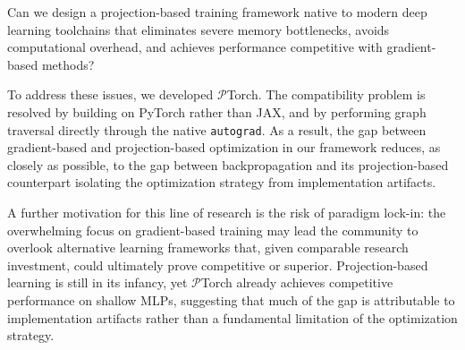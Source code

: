 \documentclass{article}
\theoremstyle{plain}
\theoremstyle{definition}
\theoremstyle{remark}
\begin{document}

\vspace{0.5em}
\begin{tcolorbox}[researchcard]
Can we design a projection-based training framework native to modern deep learning toolchains that eliminates severe memory bottlenecks, avoids computational overhead, and achieves performance competitive with gradient-based methods?
\end{tcolorbox}
\vspace{0.5em}

To address these issues, we developed $\mathcal{P}$Torch. The compatibility problem is resolved by building on PyTorch rather than JAX, and by performing graph traversal directly through the native \texttt{autograd}. As a result, the gap between gradient-based and projection-based optimization in our framework reduces, as closely as possible, to the gap between backpropagation and its projection-based counterpart isolating the optimization strategy from implementation artifacts. 

A further motivation for this line of research is the risk of paradigm lock-in: the overwhelming focus on gradient-based training may lead the community to overlook alternative learning frameworks that, given comparable research investment, could ultimately prove competitive or superior. Projection-based learning is still in its infancy, yet $\mathcal{P}$Torch already achieves competitive performance on shallow MLPs, suggesting that much of the gap is attributable to implementation artifacts rather than a fundamental limitation of the optimization strategy. 
\end{document}
